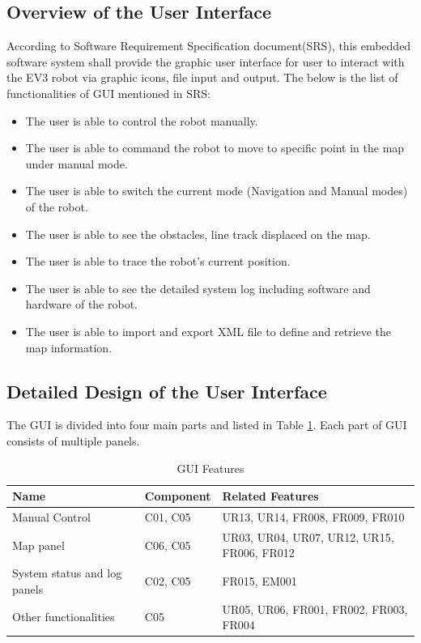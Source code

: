 \subsection{Overview of the User Interface}
According to Software Requirement Specification document(SRS), this embedded software system shall provide the graphic user interface for user to interact with the EV3 robot via graphic icons, file input and output. The below is the list of functionalities of GUI mentioned in SRS:
\begin{itemize}
	\item The user is able to control the robot manually.
	\item The user is able to command the robot to move to specific point in the map under manual mode.
	\item The user is able to switch the current mode (Navigation and Manual modes) of the robot.
	\item The user is able to see the obstacles, line track displaced on the map.
	\item The user is able to trace the robot's current position.
	\item The user is able to see the detailed system log including software and hardware of the robot.
	\item The user is able to import and export XML file to define and retrieve the map information.
\end{itemize}

\subsection{Detailed Design of the User Interface}
The GUI is divided into four main parts and listed in Table \ref{GUI Features}. Each part of GUI consists of multiple panels.

\begin{table}[H]
	\centering
	\caption{GUI Features}
	\label{GUI Features}
	\begin{tabular}{|p{3cm}|p{2cm}|p{6cm}|}
		\hline
		Name & Component & Related Features \\ \hline
		Manual Control & C01, C05 & UR13, UR14, FR008, FR009, FR010 \\ \hline
		Map panel  & C06, C05 & UR03, UR04, UR07, UR12, UR15, FR006, FR012 \\ \hline
		System status and log panels & C02, C05 & FR015, EM001 \\ \hline
		Other functionalities & C05 &  UR05, UR06, FR001, FR002, FR003, FR004 \\ \hline
	\end{tabular}
\end{table}

